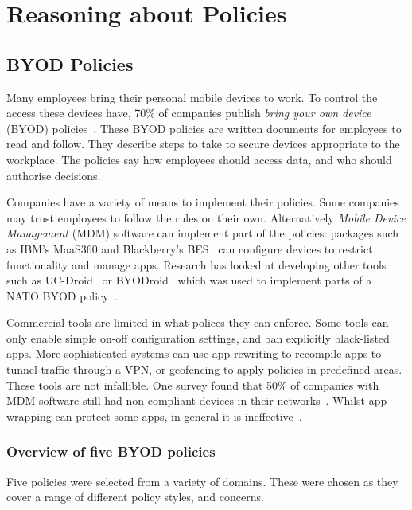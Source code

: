 \documentclass[thesis.tex]{subfiles}
\begin{document}
\chapter{Reasoning about Policies}
\label{chap:byod}

\section{BYOD Policies}

Many employees bring their personal mobile devices to work. To control the
access these devices have, 70\% of companies publish \emph{bring your own
  device} (BYOD) policies~\cite{schulze_byod_2016}. These BYOD policies are
written documents for employees to read and follow. They describe steps to take
to secure devices appropriate to the workplace. The policies say how employees
should access data, and who should authorise decisions.

Companies have a variety of means to implement their policies. Some companies
may trust employees to follow the rules on their own. Alternatively \emph{Mobile
  Device Management} (MDM) software can implement part of the policies: packages
such as IBM's MaaS360 and Blackberry's BES~\cite{_ibm_????,_secure_????} can
configure devices to restrict functionality and manage apps. Research has looked
at developing other tools such as UC-Droid~\cite{martinelli_enhancing_2016} or
BYODroid~\cite{armando_enabling_2014} which was used to implement parts of a
NATO BYOD policy~\cite{armando_developing_2016}.

Commercial tools are limited in what polices they can enforce. Some tools can
only enable simple on-off configuration settings, and ban explicitly
black-listed apps. More sophisticated systems can use app-rewriting to recompile
apps to tunnel traffic through a VPN, or geofencing to apply policies in
predefined areas. These tools are not infallible. One survey found that 50\% of
companies with MDM software still had non-compliant devices in their
networks~\cite{mobileiron_security_labs_q4_2015}. Whilst app wrapping can
protect some apps, in general it is ineffective~\cite{hao_effectiveness_2013}.

\subsection{Overview of five BYOD policies}

Five policies were selected from a variety of domains.
These were chosen as they cover a range of different policy styles, and
concerns.
\end{document}
